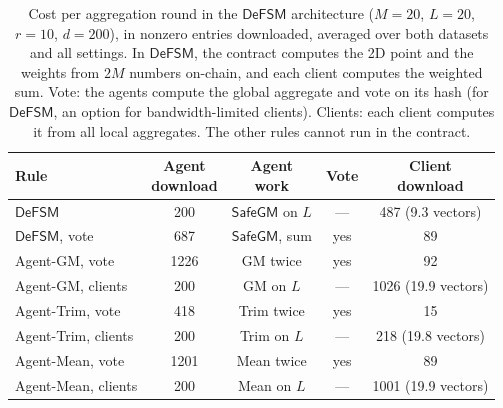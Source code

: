 \begin{table}[t]
\centering\footnotesize
\caption{Cost per aggregation round in the $\mathsf{DeFSM}$ architecture ($M=20$, $L=20$, $r=10$, $d=200$), in nonzero entries downloaded, averaged over both datasets and all settings. In $\mathsf{DeFSM}$, the contract computes the 2D point and the weights from $2M$ numbers on-chain, and each client computes the weighted sum. Vote: the agents compute the global aggregate and vote on its hash (for $\mathsf{DeFSM}$, an option for bandwidth-limited clients). Clients: each client computes it from all local aggregates. The other rules cannot run in the contract.}
\label{tab:comm}
\setlength{\tabcolsep}{2pt}
\begin{tabular}{lcccc}
\toprule
Rule & \makecell{Agent\\download} & \makecell{Agent\\work} & Vote & \makecell{Client\\download}\\
\midrule
$\mathsf{DeFSM}$ & 200 & $\mathsf{SafeGM}$ on $L$ & --- & 487 (9.3 vectors)\\
$\mathsf{DeFSM}$, vote & 687 & $\mathsf{SafeGM}$, sum & yes & 89\\
\midrule
Agent-GM, vote & 1226 & GM twice & yes & 92\\
Agent-GM, clients & 200 & GM on $L$ & --- & 1026 (19.9 vectors)\\
Agent-Trim, vote & 418 & Trim twice & yes & 15\\
Agent-Trim, clients & 200 & Trim on $L$ & --- & 218 (19.8 vectors)\\
Agent-Mean, vote & 1201 & Mean twice & yes & 89\\
Agent-Mean, clients & 200 & Mean on $L$ & --- & 1001 (19.9 vectors)\\
\bottomrule
\end{tabular}
\end{table}
